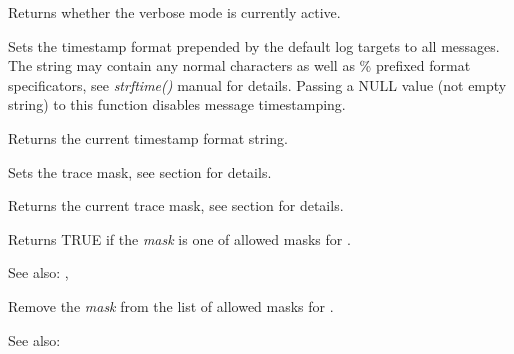 \label{wxloggetverbose}


Returns whether the verbose mode is currently active.

\label{wxlogsettimestamp}


Sets the timestamp format prepended by the default log targets to all
messages. The string may contain any normal characters as well as \%
prefixed format specificators, see {\it strftime()} manual for details.
Passing a NULL value (not empty string) to this function disables message timestamping.

\label{wxloggettimestamp}


Returns the current timestamp format string.

\label{wxlogsettracemask}


Sets the trace mask, see 
section for details.

\label{wxloggettracemask}

Returns the current trace mask, see  section
for details.

\label{wxlogisallowedtracemask}


Returns TRUE if the {\it mask} is one of allowed masks for 
.

See also: , 

\label{wxlogremovetracemask}


Remove the {\it mask} from the list of allowed masks for 
.

See also: 

